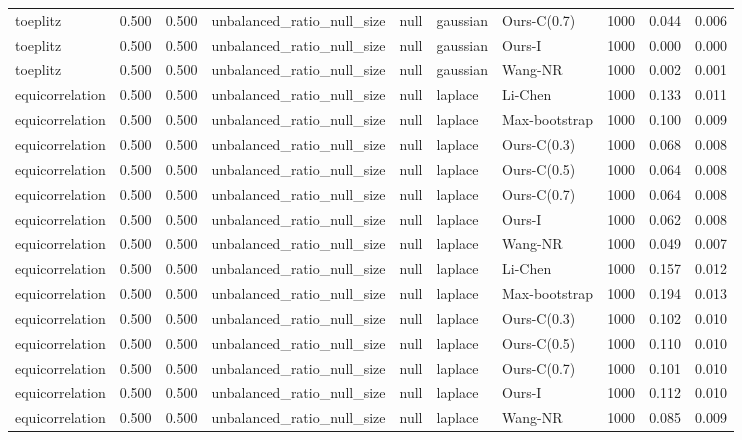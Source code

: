 \begin{tabular}{lrrllllrrr}
toeplitz & 0.500 & 0.500 & unbalanced\_ratio\_null\_size & null & gaussian & Ours-C(0.7) & 1000 & 0.044 & 0.006 \\
toeplitz & 0.500 & 0.500 & unbalanced\_ratio\_null\_size & null & gaussian & Ours-I & 1000 & 0.000 & 0.000 \\
toeplitz & 0.500 & 0.500 & unbalanced\_ratio\_null\_size & null & gaussian & Wang-NR & 1000 & 0.002 & 0.001 \\
equicorrelation & 0.500 & 0.500 & unbalanced\_ratio\_null\_size & null & laplace & Li-Chen & 1000 & 0.133 & 0.011 \\
equicorrelation & 0.500 & 0.500 & unbalanced\_ratio\_null\_size & null & laplace & Max-bootstrap & 1000 & 0.100 & 0.009 \\
equicorrelation & 0.500 & 0.500 & unbalanced\_ratio\_null\_size & null & laplace & Ours-C(0.3) & 1000 & 0.068 & 0.008 \\
equicorrelation & 0.500 & 0.500 & unbalanced\_ratio\_null\_size & null & laplace & Ours-C(0.5) & 1000 & 0.064 & 0.008 \\
equicorrelation & 0.500 & 0.500 & unbalanced\_ratio\_null\_size & null & laplace & Ours-C(0.7) & 1000 & 0.064 & 0.008 \\
equicorrelation & 0.500 & 0.500 & unbalanced\_ratio\_null\_size & null & laplace & Ours-I & 1000 & 0.062 & 0.008 \\
equicorrelation & 0.500 & 0.500 & unbalanced\_ratio\_null\_size & null & laplace & Wang-NR & 1000 & 0.049 & 0.007 \\
equicorrelation & 0.500 & 0.500 & unbalanced\_ratio\_null\_size & null & laplace & Li-Chen & 1000 & 0.157 & 0.012 \\
equicorrelation & 0.500 & 0.500 & unbalanced\_ratio\_null\_size & null & laplace & Max-bootstrap & 1000 & 0.194 & 0.013 \\
equicorrelation & 0.500 & 0.500 & unbalanced\_ratio\_null\_size & null & laplace & Ours-C(0.3) & 1000 & 0.102 & 0.010 \\
equicorrelation & 0.500 & 0.500 & unbalanced\_ratio\_null\_size & null & laplace & Ours-C(0.5) & 1000 & 0.110 & 0.010 \\
equicorrelation & 0.500 & 0.500 & unbalanced\_ratio\_null\_size & null & laplace & Ours-C(0.7) & 1000 & 0.101 & 0.010 \\
equicorrelation & 0.500 & 0.500 & unbalanced\_ratio\_null\_size & null & laplace & Ours-I & 1000 & 0.112 & 0.010 \\
equicorrelation & 0.500 & 0.500 & unbalanced\_ratio\_null\_size & null & laplace & Wang-NR & 1000 & 0.085 & 0.009 \\

\end{tabular}
